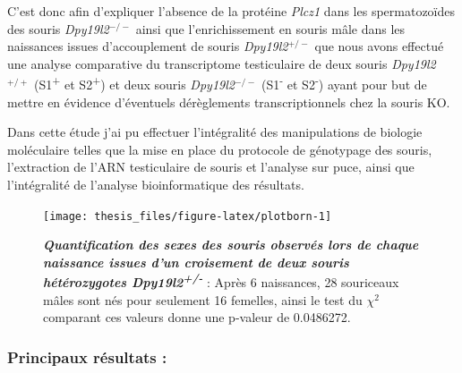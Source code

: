 \documentclass[12pt,a4paper,twoside]{ugathesis}
\theoremstyle{definition}
\theoremstyle{definition}
\theoremstyle{definition}
\theoremstyle{remark}
\begin{document}
C'est donc afin d'expliquer l'absence de la protéine \emph{Plcz1} dans
les spermatozoïdes des souris \emph{Dpy19l2}\(^{-/-}\) ainsi que
l'enrichissement en souris mâle dans les naissances issues
d'accouplement de souris \emph{Dpy19l2}\(^{+/-}\) que nous avons
effectué une analyse comparative du transcriptome testiculaire de deux
souris \emph{Dpy19l2}\(^{+/+}\) (S1\textsuperscript{+} et
S2\textsuperscript{+}) et deux souris \emph{Dpy19l2}\(^{-/-}\)
(S1\textsuperscript{-} et S2\textsuperscript{-}) ayant pour but de
mettre en évidence d'éventuels dérèglements transcriptionnels chez la
souris KO.

Dans cette étude j'ai pu effectuer l'intégralité des manipulations de
biologie moléculaire telles que la mise en place du protocole de
génotypage des souris, l'extraction de l'ARN testiculaire de souris et
l'analyse sur puce, ainsi que l'intégralité de l'analyse bioinformatique
des résultats.

\newpage

\begin{figure}

{\centering \texttt{[image: thesis\_files/figure-latex/plotborn-1]} 

}

\caption[Quantification des sexes des souris observés lors de
chaque naissance issues d'un croisement de deux souris hétérozygotes
\emph{Dpy19l2}\textsuperscript{+/-}\\]{\textbf{\emph{Quantification des sexes des souris
observés lors de chaque naissance issues d'un croisement de deux souris
hétérozygotes \emph{Dpy19l2}\textsuperscript{+/-}}} : Après 6
naissances, 28 souriceaux mâles sont nés pour seulement 16 femelles,
ainsi le test du \(\chi^2\) comparant ces valeurs donne une p-valeur de
0.0486272.}\label{fig:plotborn}
\end{figure}











\newpage



\newpage

\subsubsection{Principaux résultats :}\label{principaux-resultats-6}
\end{document}
